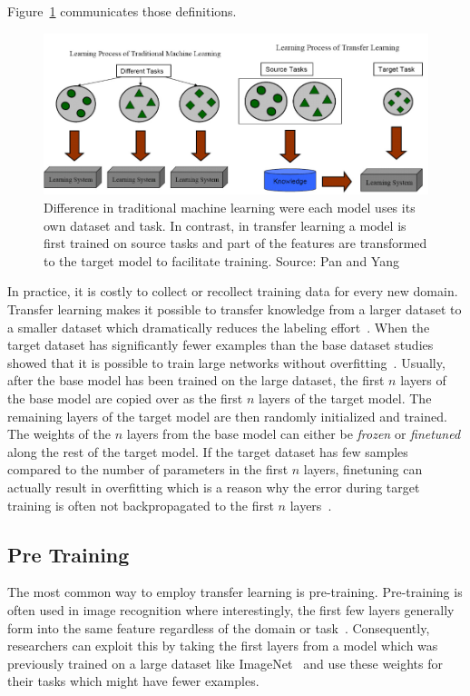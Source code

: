 Figure~\ref{fig:03_transferLearning} communicates those definitions. 
\begin{figure}[ht]
    \centering
    \includegraphics[scale=0.55]{figures/03_theory/03_transferLearning}
    \caption{Difference in traditional machine learning were each model uses its own dataset and task. In contrast, in transfer learning a model is first trained on source tasks and part of the features are transformed to the target model to facilitate training. Source: Pan and Yang~\cite{Pan2010}}
    \label{fig:03_transferLearning}
\end{figure}

In practice, it is costly to collect or recollect training data for every new domain. Transfer learning makes it possible to transfer knowledge from a larger dataset to a smaller dataset which dramatically reduces the labeling effort~\cite{Blitzer2007}. When the target dataset has significantly fewer examples than the base dataset studies showed that it is possible to train large networks without overfitting~\cite{Donahue2013}\cite{Zeiler2014}. Usually, after the base model has been trained on the large dataset, the first $n$ layers of the base model are copied over as the first $n$ layers of the target model. The remaining layers of the target model are then randomly initialized and trained. The weights of the $n$ layers from the base model can either be \textit{frozen} or \textit{finetuned} along the rest of the target model. If the target dataset has few samples compared to the number of parameters in the first $n$ layers, finetuning can actually result in overfitting which is a reason why the error during target training is often not backpropagated to the first $n$ layers~\cite{Yosinski2014}.

\subsection*{Pre Training}
The most common way to employ transfer learning is pre-training. 
Pre-training is often used in image recognition where interestingly, the first few layers generally form into the same feature regardless of the domain or task~\cite{Yosinski2014}. Consequently, researchers can exploit this by taking the first layers from a model which was previously trained on a large dataset like ImageNet~\cite{Russakovsky2015} and use these weights for their tasks which might have fewer examples.

